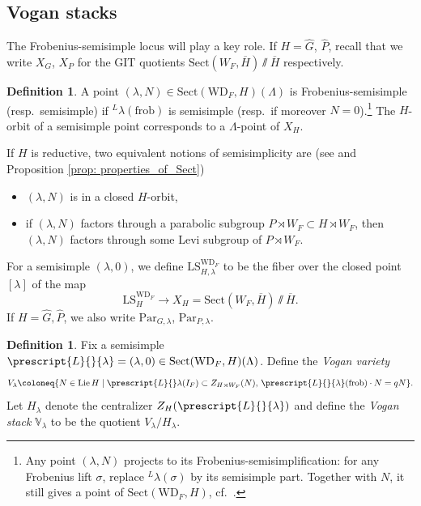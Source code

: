 \documentclass{amsart}
\theoremstyle{definition}
\newtheorem{definition}[theorem]{Definition}
\theoremstyle{remark}
\numberwithin{equation}{section}
\DeclareMathOperator{\Lie}{Lie}
\newcommand{\co}[1]{\prescript{#1}{}}
\newcommand{\wh}{\widehat}
\newcommand{\frob}{\mathrm{frob}}
\newcommand{\Par}{\mathrm{Par}}
\newcommand{\V}{\mathbb{V}}
\newcommand{\WD}{\mathrm{WD}}
\newcommand{\LS}{\mathrm{LS}}
\newcommand{\Sect}{\mathrm{Sect}}
\begin{document}
\subsection{Vogan stacks}{\label{ss: voganstacks}}
The Frobenius-semisimple locus will play a key role. 
If $H=\wh G$, $\wh P$, recall that we write $X_G$, $X_P$ for the GIT quotients $\Sect (W_F, \overline{H}) \sslash \overline{H}$ respectively. 

\begin{definition}
A point $(\lambda, N)\in \Sect (\WD_F, H)(\Lambda)$ is Frobenius-semisimple (resp.~semisimple) if ${}^L\lambda(\frob)$ is semisimple (resp.~if moreover $N=0$).\footnote{Any point $(\lambda, N)$ projects to its Frobenius-semisimplification: for any Frobenius lift $\sigma$, replace ${}^L \lambda(\sigma)$ by its semisimple part. Together with $N$, it still gives a point of $\Sect(\WD_F, H)$, cf.~\cite[Lemma 2.21]{ZhuTame}.} The $H$-orbit of a semisimple point corresponds to a $\Lambda$-point of $X_H$. 

If $H$ is reductive, two equivalent notions of semisimplicity are (see \cite[Theorem 5.5, Corollary 5.13]{DatSurvey} and Proposition \ref{prop: properties_of_Sect})
\begin{itemize}
    \item $(\lambda, N)$ is in a closed $H$-orbit, 
    \item if $(\lambda, N)$ factors through a parabolic subgroup $P\rtimes W_F \subset H\rtimes W_F$, then $(\lambda, N)$ factors through some Levi subgroup of $P\rtimes W_F$.
\end{itemize}

For a semisimple $(\lambda, 0)$, we define $\LS^{\WD_F}_{H,\lambda}$ to be the fiber over the closed point $[\lambda]$ of the map
\[
\LS^{\WD_F}_H \to X_H=\Sect (W_F, \overline{H})\sslash \overline{H}. 
\]
If $H=\wh G, \wh P$, we also write $\Par_{G,\lambda}$, $\Par_{P,\lambda}$. 
\end{definition} 

\begin{definition}\label{def: VoganVariety}
    Fix a semisimple $\co{L}{\lambda}=(\lambda, 0) \in \Sect(\WD_F, H)(\Lambda)$. Define the \emph{Vogan variety}
    \begin{equation*}
        V_{\lambda} \coloneq \{ N \in \Lie H \mid \co{L}\lambda(I_F) \subset Z_{H\rtimes W_F}(N), \, \co{L}{\lambda}(\frob) \cdot N = qN \}. 
    \end{equation*}
    Let $H_{\lambda}$ denote the centralizer $Z_{H}(\co{L}{\lambda})$ and define the \emph{Vogan stack} $\V_\lambda$ to be the quotient $V_{\lambda} / H_{\lambda}$. 
\end{definition}
\end{document}
